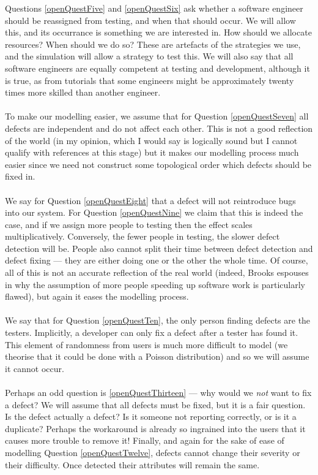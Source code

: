 Questions \ref{openQuestFive} and \ref{openQuestSix} ask whether a software engineer should be reassigned from testing, and
when that should occur.
We will allow this, and its occurrance is something we are interested in.
How should we allocate resources?
When should we do so?
These are artefacts of the strategies we use, and the simulation will allow a strategy to test
this.
We will also say that all software engineers are equally competent at testing and development,
although it is true, as from tutorials that some engineers might be approximately twenty times
more skilled than another engineer.\\
\\
To make our modelling easier, we assume that for Question \ref{openQuestSeven} all defects are
independent and do not affect each other.
This is not a good reflection of the world (in my opinion, which I would say is
    logically sound but I cannot qualify with references at this stage) but it makes our modelling process much
easier since we need not construct some topological order which defects should be fixed in.\\
\\
We say for Question \ref{openQuestEight} that a defect will not reintroduce bugs into our system.
For Question \ref{openQuestNine} we claim that this is indeed the case, and if we assign more people
to testing then the effect scales multiplicatively.
Conversely, the fewer people in testing, the slower defect detection will be.
People also cannot split their time between defect detection and defect fixing --- they are either
doing one or the other the whole time.
Of course, all of this is not an accurate reflection of the real world (indeed, Brooks espouses in
\cite{brooks1987no} why the assumption of more people speeding up software work is particularly flawed), but again
it eases the modelling process.\\
\\
We say that for Question \ref{openQuestTen}, the only person finding defects are the
testers.
Implicitly, a developer can only fix a defect after a tester has found it.
This element of randomness from users is much more difficult to model (we theorise that it could be
done with a Poisson distribution) and so we will assume it cannot occur.\\
\\
Perhaps an odd question is \ref{openQuestThirteen} --- why would we {\em not}
want to fix a defect?
We will assume that all defects must be fixed, but it is a fair question.
Is the defect actually a defect?
Is it someone not reporting correctly, or is it a duplicate?
Perhaps the workaround is already so ingrained into the users that it causes
more trouble to remove it!
Finally, and again for the sake of ease of modelling Question \ref{openQuestTwelve}, defects cannot
change their severity or their difficulty.
Once detected their attributes will remain the same.

